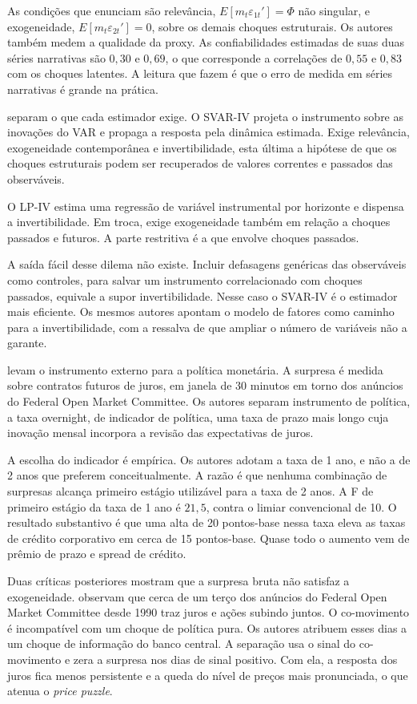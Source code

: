 \documentclass[preprint,authoryear,review,12pt]{elsarticle}
\begin{document}
As condições que enunciam são relevância, $E[m_t \varepsilon_{1t}'] = \Phi$ não singular, e exogeneidade, $E[m_t \varepsilon_{2t}'] = 0$, sobre os demais choques estruturais. Os autores também medem a qualidade da proxy. As confiabilidades estimadas de suas duas séries narrativas são $0{,}30$ e $0{,}69$, o que corresponde a correlações de $0{,}55$ e $0{,}83$ com os choques latentes. A leitura que fazem é que o erro de medida em séries narrativas é grande na prática.

\cite{stockwatson2018} separam o que cada estimador exige. O SVAR-IV projeta o instrumento sobre as inovações do VAR e propaga a resposta pela dinâmica estimada. Exige relevância, exogeneidade contemporânea e invertibilidade, esta última a hipótese de que os choques estruturais podem ser recuperados de valores correntes e passados das observáveis.

O LP-IV estima uma regressão de variável instrumental por horizonte e dispensa a invertibilidade. Em troca, exige exogeneidade também em relação a choques passados e futuros. A parte restritiva é a que envolve choques passados.

A saída fácil desse dilema não existe. Incluir defasagens genéricas das observáveis como controles, para salvar um instrumento correlacionado com choques passados, equivale a supor invertibilidade. Nesse caso o SVAR-IV é o estimador mais eficiente. Os mesmos autores apontam o modelo de fatores como caminho para a invertibilidade, com a ressalva de que ampliar o número de variáveis não a garante.

\cite{gertler2015} levam o instrumento externo para a política monetária. A surpresa é medida sobre contratos futuros de juros, em janela de 30 minutos em torno dos anúncios do Federal Open Market Committee. Os autores separam instrumento de política, a taxa overnight, de indicador de política, uma taxa de prazo mais longo cuja inovação mensal incorpora a revisão das expectativas de juros.

A escolha do indicador é empírica. Os autores adotam a taxa de 1 ano, e não a de 2 anos que preferem conceitualmente. A razão é que nenhuma combinação de surpresas alcança primeiro estágio utilizável para a taxa de 2 anos. A F de primeiro estágio da taxa de 1 ano é $21{,}5$, contra o limiar convencional de 10. O resultado substantivo é que uma alta de 20 pontos-base nessa taxa eleva as taxas de crédito corporativo em cerca de 15 pontos-base. Quase todo o aumento vem de prêmio de prazo e spread de crédito.

Duas críticas posteriores mostram que a surpresa bruta não satisfaz a exogeneidade. \cite{jarocinski2020} observam que cerca de um terço dos anúncios do Federal Open Market Committee desde 1990 traz juros e ações subindo juntos. O co-movimento é incompatível com um choque de política pura. Os autores atribuem esses dias a um choque de informação do banco central. A separação usa o sinal do co-movimento e zera a surpresa nos dias de sinal positivo. Com ela, a resposta dos juros fica menos persistente e a queda do nível de preços mais pronunciada, o que atenua o \textit{price puzzle}.
\end{document}
